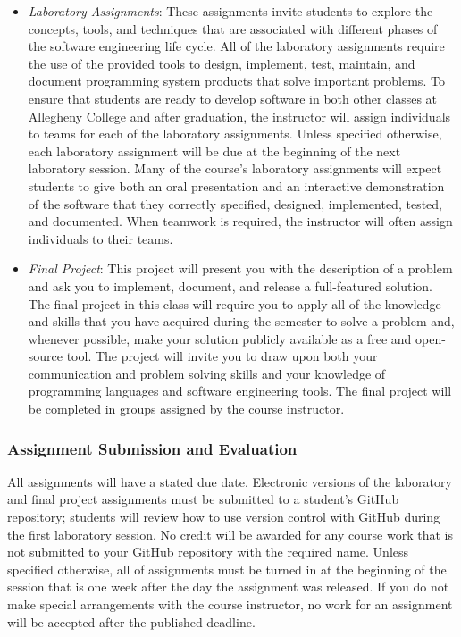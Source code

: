 \documentclass[11pt]{article}
\begin{document}
\begin{itemize}
  \item {\em Laboratory Assignments\/}: These assignments invite students to explore the concepts, tools, and techniques
    that are associated with different phases of the software engineering life cycle. All of the laboratory assignments
    require the use of the provided tools to design, implement, test, maintain, and document programming system products
    that solve important problems. To ensure that students are ready to develop software in both other classes at
    Allegheny College and after graduation, the instructor will assign individuals to teams for each of the laboratory
    assignments. Unless specified otherwise, each laboratory assignment will be due at the beginning of the next
    laboratory session. Many of the course's laboratory assignments will expect students to give both an oral
    presentation and an interactive demonstration of the software that they correctly specified, designed, implemented,
    tested, and documented. When teamwork is required, the instructor will often assign individuals to their teams.

  \item {\em Final Project\/}: This project will present you with the description of a problem and ask you to implement,
    document, and release a full-featured solution. The final project in this class will require you to apply all of the
    knowledge and skills that you have acquired during the semester to solve a problem and, whenever possible, make your
    solution publicly available as a free and open-source tool. The project will invite you to draw upon both your
    communication and problem solving skills and your knowledge of programming languages and software engineering tools.
    The final project will be completed in groups assigned by the course instructor.

\end{itemize}

\subsubsection*{Assignment Submission and Evaluation}

All assignments will have a stated due date. Electronic versions of the laboratory and final project assignments must be
submitted to a student's GitHub repository; students will review how to use version control with GitHub during the first
laboratory session. No credit will be awarded for any course work that is not submitted to your GitHub repository with
the required name. Unless specified otherwise, all of assignments must be turned in at the beginning of the session that
is one week after the day the assignment was released. If you do not make special arrangements with the course
instructor, no work for an assignment will be accepted after the published deadline.
\end{document}
